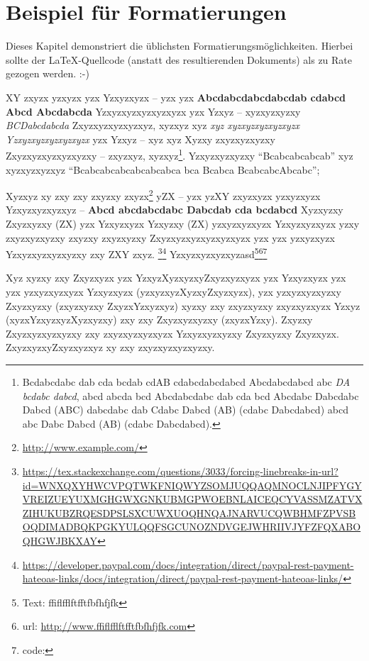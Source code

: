 \chapter{Beispiel für Formatierungen}

Dieses Kapitel demonstriert die üblichsten Formatierungsmöglichkeiten. Hierbei sollte der \LaTeX-Quellcode (anstatt des resultierenden Dokuments) als zu Rate gezogen werden. :-)


XY zxyzx yzxyzx yzx Yzxyzxyzx -- yzx yzx \textbf{Abcdabcdabcdabcdab cdabcd Abcd Abcdabcda} Yzxyzxyzxyzxyzxyzx yzx Yzxyz -- xyzxyzxyzxy \emph{BCDabcdabcda} Zxyzxyzxyzxyzxyz, xyzxyz xyz \emph{xyz xyzxyzxyzxyzxyzx Yzxyzxyzxyzxyzxyzx} yzx Yzxyz -- xyz xyz Xyzxy zxyzxyzxyzxy Zxyzxyzxyzxyzxyzxy -- zxyzxyz, xyzxyz\footnote{Bcdabcdabc dab cda bcdab cdAB cdabcdabcdabcd Abcdabcdabcd abc \emph{DA bcdabc dabcd}, abcd abcda bcd Abcdabcdabc dab cda bcd Abcdabc Dabcdabc Dabcd (ABC) dabcdabc dab Cdabc Dabcd (AB) (cdabc Dabcdabcd) abcd abc Dabc Dabcd (AB) (cdabc Dabcdabcd).}. Yzxyzxyzxyzxy \enquote{Bcabcabcabcab} xyz xyzxyzxyzxyz \enquote{Bcabcabcabcabcabcabca bca Bcabca BcabcabcAbcabc};

Xyzxyz xy zxy zxy zxyzxy zxyzx\footnote{\url{http://www.example.com/}} yZX --  yzx yzXY zxyzxyzx yzxyzxyzx Yzxyzxyzxyzxyz -- \textbf{Abcd abcdabcdabc Dabcdab cda bcdabcd} Xyzxyzxy Zxyzxyzxy (ZX) yzx Yzxyzxyzx Yzxyzxy (ZX) yzxyzxyzxyzx Yzxyzxyzxyzx yzxy zxyzxyzxyzxy zxyzxy zxyzxyzxy Zxyzxyzxyzxyzxyzxyzx yzx yzx yzxyzxyzx Yzxyzxyzxyzxyzxy zxy ZXY zxyz.
\footnote{\url{https://tex.stackexchange.com/questions/3033/forcing-linebreaks-in-url?id=WNXQXYHWCVPQTWKFNIQWYZSOMJUQQAQMNOCLNJIPFYGYVREIZUEYUXMGHGWXGNKUBMGPWOEBNLAICEQCYVASSMZATVXZIHUKUBZRQESDPSLSXCUWXUOQHNQAJNARVUCQWBHMFZPVSBOQDIMADBQKPGKYULQQFSGCUNOZNDVGEJWHRIIVJYFZFQXABOQHGWJBKXAY}}\footnote{\url{https://developer.paypal.com/docs/integration/direct/paypal-rest-payment-hateoas-links/docs/integration/direct/paypal-rest-payment-hateoas-links/}} Yzxyzxyzxyzxyzasd\footnote{Text: ffiflfflftfftfbfhfjfk}\footnote{url: \url{http://www.ffiflfflftfftfbfhfjfk.com}}\footnote{code: }

Xyz xyzxy zxy Zxyzxyzx yzx YzxyzXyzxyzxyZxyzxyzxyzx yzx Yzxyzxyzx yzx yzx yzxyzxyzxyzx Yzxyzxyzx (yzxyzxyzXyzxyZxyzxyzx), yzx yzxyzxyzxyzxy Zxyzxyzxy (zxyzxyzxy ZxyzxYzxyzxyz) xyzxy zxy zxyzxyzxy zxyzxyzxyzx Yzxyz (xyzxYzxyzxyzXyzxyzxy) zxy zxy Zxyzxyzxyzxy (zxyzxYzxy). Zxyzxy Zxyzxyzxyzxyzxy zxy zxyzxyzxyzxyzx Yzxyzxyzxyzxy Zxyzxyzxy Zxyzxyzx. ZxyzxyzxyZxyzxyzxyz xy zxy zxyzxyzxyzxyzxy.

